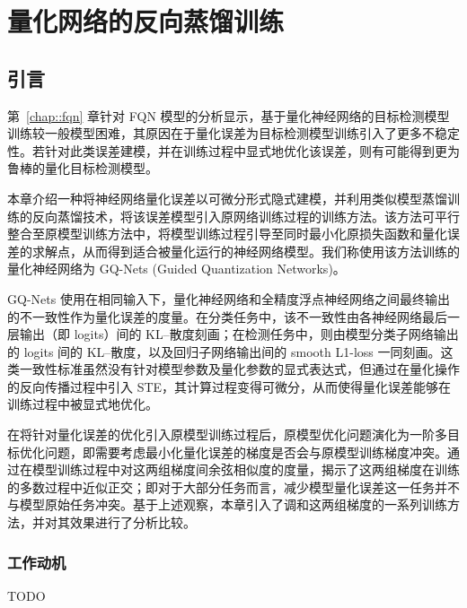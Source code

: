 \chapter{量化网络的反向蒸馏训练} \label{chap::gq-nets}

\section{引言}
第~\ref{chap::fqn} 章针对 FQN 模型的分析显示，基于量化神经网络的目标检测模型训练较一般模型困难，其原因在于量化误差为目标检测模型训练引入了更多不稳定性。若针对此类误差建模，并在训练过程中显式地优化该误差，则有可能得到更为鲁棒的量化目标检测模型。

本章介绍一种将神经网络量化误差以可微分形式隐式建模，并利用类似模型蒸馏训练的反向蒸馏技术，将该误差模型引入原网络训练过程的训练方法。该方法可平行整合至原模型训练方法中，将模型训练过程引导至同时最小化原损失函数和量化误差的求解点，从而得到适合被量化运行的神经网络模型。我们称使用该方法训练的量化神经网络为 GQ-Nets (Guided Quantization Networks)。

GQ-Nets 使用在相同输入下，量化神经网络和全精度浮点神经网络之间最终输出的不一致性作为量化误差的度量。在分类任务中，该不一致性由各神经网络最后一层输出（即 logits）间的 KL--散度刻画；在检测任务中，则由模型分类子网络输出的 logits 间的 KL--散度，以及回归子网络输出间的 smooth L1-loss 一同刻画。这类一致性标准虽然没有针对模型参数及量化参数的显式表达式，但通过在量化操作的反向传播过程中引入 STE，其计算过程变得可微分，从而使得量化误差能够在训练过程中被显式地优化。

在将针对量化误差的优化引入原模型训练过程后，原模型优化问题演化为一阶多目标优化问题，即需要考虑最小化量化误差的梯度是否会与原模型训练梯度冲突。通过在模型训练过程中对这两组梯度间余弦相似度的度量，揭示了这两组梯度在训练的多数过程中近似正交；即对于大部分任务而言，减少模型量化误差这一任务并不与模型原始任务冲突。基于上述观察，本章引入了调和这两组梯度的一系列训练方法，并对其效果进行了分析比较。
\subsection{工作动机}
TODO
